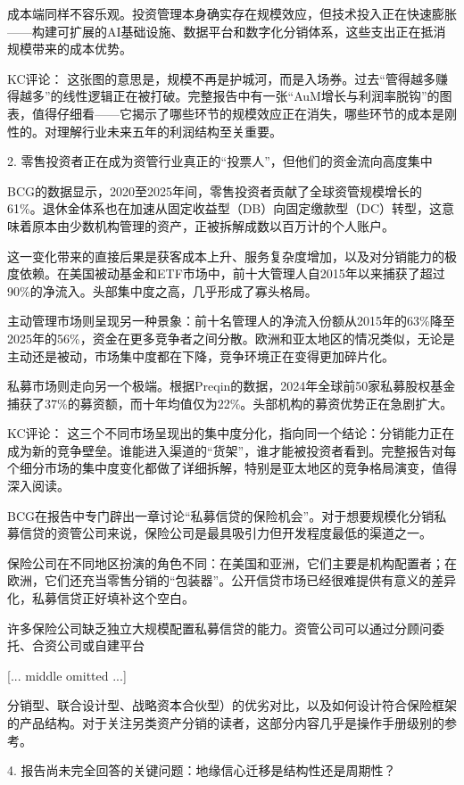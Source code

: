 \documentclass[11pt]{ctexart}
\begin{document}
成本端同样不容乐观。投资管理本身确实存在规模效应，但技术投入正在快速膨胀——构建可扩展的AI基础设施、数据平台和数字化分销体系，这些支出正在抵消规模带来的成本优势。

KC评论： 这张图的意思是，规模不再是护城河，而是入场券。过去“管得越多赚得越多”的线性逻辑正在被打破。完整报告中有一张“AuM增长与利润率脱钩”的图表，值得仔细看——它揭示了哪些环节的规模效应正在消失，哪些环节的成本是刚性的。对理解行业未来五年的利润结构至关重要。

2. 零售投资者正在成为资管行业真正的“投票人”，但他们的资金流向高度集中

BCG的数据显示，2020至2025年间，零售投资者贡献了全球资管规模增长的61\%。退休金体系也在加速从固定收益型（DB）向固定缴款型（DC）转型，这意味着原本由少数机构管理的资产，正被拆解成数以百万计的个人账户。

这一变化带来的直接后果是获客成本上升、服务复杂度增加，以及对分销能力的极度依赖。在美国被动基金和ETF市场中，前十大管理人自2015年以来捕获了超过90\%的净流入。头部集中度之高，几乎形成了寡头格局。

主动管理市场则呈现另一种景象：前十名管理人的净流入份额从2015年的63\%降至2025年的56\%，资金在更多竞争者之间分散。欧洲和亚太地区的情况类似，无论是主动还是被动，市场集中度都在下降，竞争环境正在变得更加碎片化。

私募市场则走向另一个极端。根据Preqin的数据，2024年全球前50家私募股权基金捕获了37\%的募资额，而十年均值仅为22\%。头部机构的募资优势正在急剧扩大。

KC评论： 这三个不同市场呈现出的集中度分化，指向同一个结论：分销能力正在成为新的竞争壁垒。谁能进入渠道的“货架”，谁才能被投资者看到。完整报告对每个细分市场的集中度变化都做了详细拆解，特别是亚太地区的竞争格局演变，值得深入阅读。

BCG在报告中专门辟出一章讨论“私募信贷的保险机会”。对于想要规模化分销私募信贷的资管公司来说，保险公司是最具吸引力但开发程度最低的渠道之一。

保险公司在不同地区扮演的角色不同：在美国和亚洲，它们主要是机构配置者；在欧洲，它们还充当零售分销的“包装器”。公开信贷市场已经很难提供有意义的差异化，私募信贷正好填补这个空白。

许多保险公司缺乏独立大规模配置私募信贷的能力。资管公司可以通过分顾问委托、合资公司或自建平台

[... middle omitted ...]

分销型、联合设计型、战略资本合伙型）的优劣对比，以及如何设计符合保险框架的产品结构。对于关注另类资产分销的读者，这部分内容几乎是操作手册级别的参考。

4. 报告尚未完全回答的关键问题：地缘信心迁移是结构性还是周期性？
\end{document}
